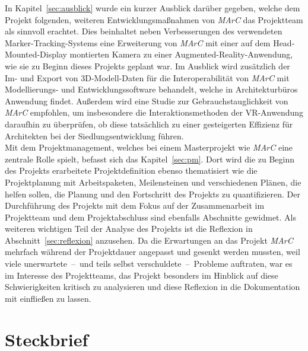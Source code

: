 In Kapitel~\ref{sec:ausblick} wurde ein kurzer Ausblick darüber gegeben, welche dem Projekt folgenden, weiteren Entwicklungsmaßnahmen von \emph{MArC} das Projektteam als sinnvoll erachtet. Dies beinhaltet neben Verbesserungen des verwendeten Marker-Tracking-Systems eine Erweiterung von \emph{MArC} mit einer auf dem Head-Mounted-Display montierten Kamera zu einer Augmented-Reality-Anwendung, wie sie zu Beginn dieses Projekts geplant war. Im Ausblick wird zusätzlich der Im- und Export von 3D-Modell-Daten für die Interoperabilität von \emph{MArC} mit Modellierungs- und Entwicklungssoftware behandelt, welche in Architekturbüros Anwendung findet. Außerdem wird eine Studie zur Gebrauchstauglichkeit von \emph{MArC} empfohlen, um insbesondere die Interaktionsmethoden der VR-Anwendung daraufhin zu überprüfen, ob diese tatsächlich zu einer gesteigerten Effizienz für Architekten bei der Siedlungsentwicklung führen.\\
Mit dem Projektmanagement, welches bei einem Masterprojekt wie \emph{MArC} eine zentrale Rolle spielt, befasst sich das Kapitel~\ref{sec:pm}. Dort wird die zu Beginn des Projekts erarbeitete Projektdefinition ebenso thematisiert wie die Projektplanung mit Arbeitspaketen, Meilensteinen und verschiedenen Plänen, die helfen sollen, die Planung und den Fortschritt des Projekts zu quantifizieren. Der Durchführung des Projekts mit dem Fokus auf der Zusammenarbeit im Projektteam und dem Projektabschluss sind ebenfalls Abschnitte gewidmet. Als weiteren wichtigen Teil der Analyse des Projekts ist die Reflexion in Abschnitt~\ref{sec:reflexion} anzusehen. Da die Erwartungen an das Projekt \emph{MArC} mehrfach während der Projektdauer angepasst und gesenkt werden mussten, weil viele unerwartete~--~und teils selbst verschuldete~--~Probleme auftraten, war es im Interesse des Projektteams, das Projekt besonders im Hinblick auf diese Schwierigkeiten kritisch zu analysieren und diese Reflexion in die Dokumentation mit einfließen zu lassen.

\section{Steckbrief} 